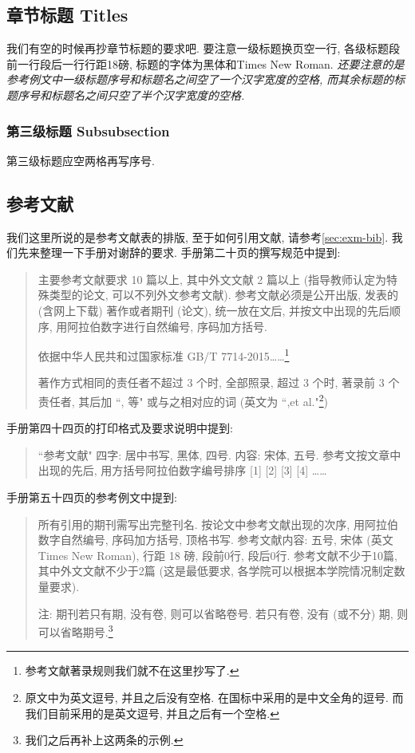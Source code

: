 \subsection{章节标题 Titles}


我们有空的时候再抄章节标题的要求吧. 要注意一级标题换页空一行, 各级标题段前一行段后一行行距18磅, 标题的字体为黑体和Times New Roman. \emph{还要注意的是参考例文中一级标题序号和标题名之间空了一个汉字宽度的空格, 而其余标题的标题序号和标题名之间只空了半个汉字宽度的空格.}

\subsubsection{第三级标题 Subsubsection}

第三级标题应空两格再写序号.

\zhlipsum[1]

\subsection{参考文献}

我们这里所说的是参考文献表的排版, 至于如何引用文献, 请参考\ref{sec:exm-bib}. 我们先来整理一下手册对谢辞的要求. 手册第二十页的撰写规范中提到:
\begin{quote}
  主要参考文献要求 10 篇以上, 其中外文文献 2 篇以上 (指导教师认定为特殊类型的论文, 可以不列外文参考文献).  参考文献必须是公开出版, 发表的 (含网上下载) 著作或者期刊 (论文), 统一放在文后, 并按文中出现的先后顺序, 用阿拉伯数字进行自然编号, 序码加方括号.

  依据中华人民共和过国家标准 GB/T 7714-2015\ldots\ldots\footnote{参考文献著录规则我们就不在这里抄写了.}

  著作方式相同的责任者不超过 3 个时, 全部照录, 超过 3 个时, 著录前 3 个责任者, 其后加 ``, 等" 或与之相对应的词 (英文为 ``,et al."\footnote{原文中为英文逗号, 并且之后没有空格. 在国标中采用的是中文全角的逗号. 而我们目前采用的是英文逗号, 并且之后有一个空格.})
\end{quote}
手册第四十四页的打印格式及要求说明中提到:
\begin{quote}
  ``参考文献" 四字: 居中书写, 黑体, 四号.
  内容: 宋体, 五号.
  参考文按文章中出现的先后, 用方括号阿拉伯数字编号排序 [1] [2] [3] [4] \dots\dots
\end{quote}
手册第五十四页的参考例文中提到:
\begin{quote}
  所有引用的期刊需写出完整刊名. 按论文中参考文献出现的次序, 用阿拉伯数字自然编号, 序码加方括号, 顶格书写.
  参考文献内容: 五号, 宋体 (英文 Times New Roman), 行距 18 磅, 段前0行, 段后0行.
  参考文献不少于10篇, 其中外文文献不少于2篇 (这是最低要求, 各学院可以根据本学院情况制定数量要求).

  注: 期刊若只有期, 没有卷, 则可以省略卷号. 若只有卷, 没有 (或不分) 期, 则可以省略期号.\footnote{我们之后再补上这两条的示例.}
\end{quote}


